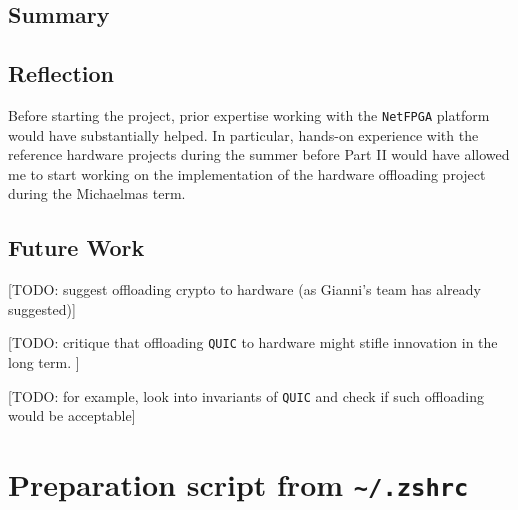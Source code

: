 \documentclass[12pt,a4paper,twoside,openright]{report}
\begin{document}

\section{Summary}

\section{Reflection}
Before starting the project, prior expertise working with the \texttt{NetFPGA} platform would have substantially helped.
In particular, hands-on experience with the reference hardware projects during the summer before Part II would have allowed me to start working on the implementation of the hardware offloading project during the Michaelmas term.


\section{Future Work}
[TODO: suggest offloading crypto to hardware (as Gianni's team has already suggested)]

[TODO: critique that offloading \texttt{QUIC} to hardware might stifle innovation in the long term. ]

[TODO: for example, look into invariants of \texttt{QUIC} and check if such offloading would be acceptable]



\appendix

\chapter{Preparation script from \texttt{\textasciitilde/.zshrc}} \label{preparation_script_from_zshrc}
\end{document}
